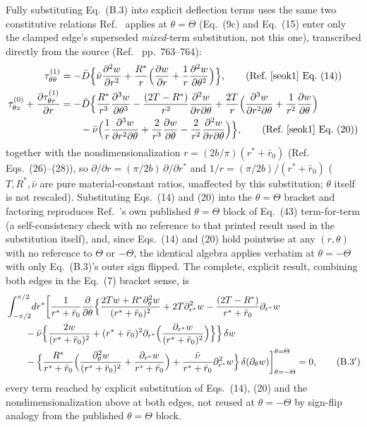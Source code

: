 \documentclass[11pt]{article}
\begin{document}
Fully substituting Eq.~(B.3) into explicit deflection terms uses the same
two constitutive relations Ref.~\cite{seok1} applies at $\theta=\Theta$
(Eq.~(9c) and Eq.~(15) enter only the clamped edge's superseded
\emph{mixed}-term substitution, not this one), transcribed directly from
the source (Ref.~\cite{seok1} pp.~763--764):
\begin{align}
\tau^{(1)}_{\theta\theta}&=-\bar D\Big\{\bar\nu\frac{\partial^2w}{\partial r^2}
+\frac{R^{*}}{r}\Big(\frac{\partial w}{\partial r}+\frac1r\frac{\partial^2w}{\partial\theta^2}\Big)\Big\},
\tag{Ref.~\cite{seok1} Eq.~(14)}\\
\tau^{(0)}_{\theta z}+\frac{\partial\tau^{(1)}_{\theta r}}{\partial r}
&=-\bar D\Big\{\frac{R^{*}}{r^3}\frac{\partial^3w}{\partial\theta^3}
-\frac{(2T-R^{*})}{r^2}\frac{\partial^2w}{\partial r\partial\theta}
+\frac{2T}{r}\Big(\frac{\partial^3w}{\partial r^2\partial\theta}
+\frac1{r^2}\frac{\partial w}{\partial\theta}\Big)\notag\\
&\qquad-\bar\nu\Big(\frac1r\frac{\partial^3w}{\partial r^2\partial\theta}
+\frac2{r^3}\frac{\partial w}{\partial\theta}
-\frac2{r^2}\frac{\partial^2w}{\partial r\partial\theta}\Big)\Big\},
\tag{Ref.~\cite{seok1} Eq.~(20)}
\end{align}
together with the nondimensionalization $r=(2b/\pi)(r^{*}+\bar r_0)$
(Ref.~\cite{seok1} Eqs.~(26)--(28)), so $\partial/\partial
r=(\pi/2b)\,\partial/\partial r^{*}$ and $1/r=(\pi/2b)/(r^{*}+\bar r_0)$
($T,R^{*},\bar\nu$ are pure material-constant ratios, unaffected by this
substitution; $\theta$ itself is not rescaled). Substituting Eqs.~(14) and
(20) into the $\theta=\Theta$ bracket and factoring reproduces
Ref.~\cite{seok1}'s own published $\theta=\Theta$ block of Eq.~(43)
term-for-term (a self-consistency check with no reference to that
printed result used in the substitution itself), and, since Eqs.~(14) and
(20) hold pointwise at any $(r,\theta)$ with no reference to $\Theta$ or
$-\Theta$, the identical algebra applies verbatim at $\theta=-\Theta$ with
only Eq.~(B.3)'s outer sign flipped. The complete, explicit result, combining both edges in the
Eq.~(7) bracket sense, is
\begin{align}
&\int_{-\pi/2}^{\pi/2}\!dr^{*}\bigg[\frac1{r^{*}+\bar r_0}\frac{\partial}{\partial\theta}
\Big\{\frac{2Tw+R^{*}\partial_\theta^2w}{(r^{*}+\bar r_0)^2}
+2T\partial_{r^{*}}^2w-\frac{(2T-R^{*})}{r^{*}+\bar r_0}\partial_{r^{*}}w\notag\\
&\qquad-\bar\nu\Big\{\frac{2w}{(r^{*}+\bar r_0)^2}
+(r^{*}+\bar r_0)^2\partial_{r^{*}}\Big(\frac{\partial_{r^{*}}w}{(r^{*}+\bar r_0)^2}\Big)\Big\}\Big\}\,\delta w\notag\\
&\qquad-\Big\{\frac{R^{*}}{r^{*}+\bar r_0}\Big(\frac{\partial_\theta^2w}{(r^{*}+\bar r_0)^2}
+\frac{\partial_{r^{*}}w}{r^{*}+\bar r_0}\Big)
+\frac{\bar\nu}{r^{*}+\bar r_0}\partial_{r^{*}}^2w\Big\}\,\delta(\partial_\theta w)\bigg]_{\theta=-\Theta}^{\theta=\Theta}=0,
\tag{B.3$'$}
\end{align}
every term reached by explicit substitution of Eqs.~(14), (20) and the
nondimensionalization above at both edges, not reused at $\theta=-\Theta$
by sign-flip analogy from the published $\theta=\Theta$ block.
\end{document}
